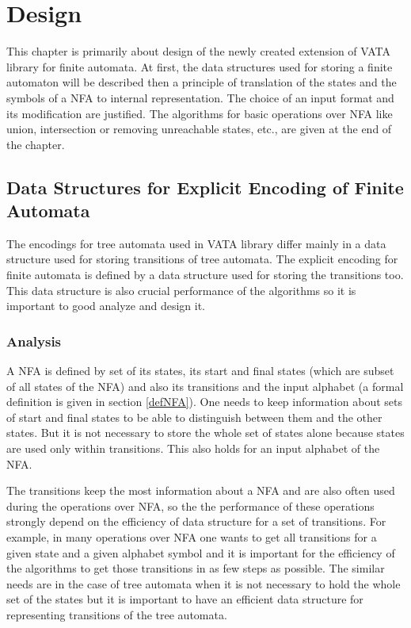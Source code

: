 \chapter{Design}
\label{design}
This chapter is primarily about design of the newly created extension of VATA library for finite automata. 
At first, the data structures used for storing a finite automaton will be described then a principle of translation of the states and the symbols of a NFA 
to internal representation. The choice of an input format and its modification are justified.  
The algorithms for basic operations over NFA like union, intersection or removing unreachable states, etc., are given at the end of the chapter.

\section{Data Structures for Explicit Encoding of Finite Automata}
The encodings for tree automata used in VATA library differ mainly in a data structure used for storing transitions of tree automata. The explicit encoding
for finite automata is defined by a data structure used for storing the transitions too. 
This data structure is also crucial performance of the algorithms so it is important to good analyze and design it. 

\label{data structure explicit}
\subsection{Analysis}
\label{analysis}
A NFA is defined by set of its states, its start and final states (which are subset of all states of the NFA) and also its
transitions and the input alphabet (a formal definition is given in section \ref{defNFA}). 
One needs to keep information about sets of start and final states to be able to distinguish
between them and the other states. But it is not necessary to store the whole set of states alone because states are used only within transitions. 
This also holds for an input alphabet of the NFA. 

The transitions keep the most information about a NFA and are also often used
during the operations over NFA, so the the performance of these operations strongly depend on the efficiency of data structure for a set of transitions. 
For example, in many operations over NFA one wants to get all transitions for a given state and a given alphabet symbol and it is important for 
the efficiency of the algorithms to get those transitions in as few steps as possible. The similar needs are in the case
of tree automata when it is not necessary to hold the whole set of the states but it is important to have an efficient data structure for representing 
transitions of the tree automata.

